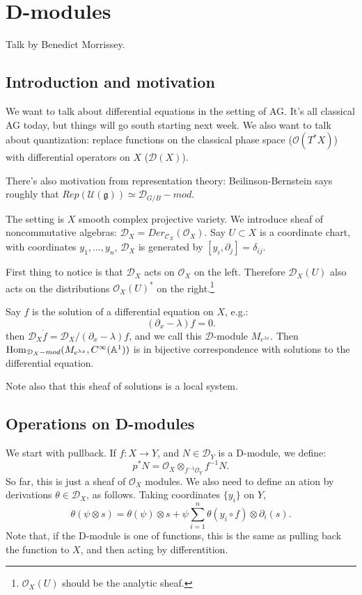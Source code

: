 \chapter{D-modules}
Talk by Benedict Morrissey.

\section{Introduction and motivation}

We want to talk about differential equations in the setting of AG. It's all classical AG today, but things will go south starting
next week. We also want to talk about quantization: replace functions on the classical phase space ($\mathcal{O}(T^*X)$) with
differential operators on $X$ ($\mathcal{D}(X)$).

There's also motivation from representation theory: Beilinson-Bernstein says roughly that $Rep(\mathcal{U}(\mathfrak g))
\simeq \mathcal{D}_{G/B} - mod$.

The setting is $X$ smooth complex projective variety. We introduce sheaf of noncommutative algebras: $\mathcal{D}_X
 = Der_{\mathcal{C}_X}(\mathcal{O}_X)$. Say $U \subset X$ is a coordinate chart, with coordinates $y_1, \dots, y_n$,
$\mathcal{D}_X$ is generated by $[y_i, \partial_j] = \delta_{ij}$.

First thing to notice is that $\mathcal{D}_X$ acts on $\mathcal{O}_X$ on the left. Therefore $\mathcal{D}_X(U)$ also
acts on the distributions $\mathcal{O}_X(U)^*$ on the right.\footnote{$\mathcal{O}_X(U)$ should be the analytic sheaf.}

Say $f$ is the solution of a differential equation on $X$, e.g.:
\[	(\partial_x - \lambda) f = 0. 	\]
then $\mathcal{D}_X \dot f = \mathcal{D}_X / (\partial_x - \lambda) f$, and we call this $\mathcal{D}$-module
$M_{e^{\lambda x}}$. Then $\operatorname{Hom}_{\mathcal{D}_X -mod}(M_{e^{\lambda x}}, C^{\infty}(\mathbb A^1))$ is in bijective
correspondence with solutions to the differential equation.

Note also that this sheaf of solutions is a local system. 


\section{Operations on D-modules}
\begin{eg}
We start with pullback. If $f:X \to Y$, and $N \in \mathcal{D}_Y$ is a D-module, we define:
\[	p^*N = \mathcal{O}_X \otimes_{f^{-1} \mathcal{O}_Y} f^{-1} N.	\]
So far, this is just a sheaf of $\mathcal{O}_X$ modules. We also need to define an ation by derivations $\theta \in \mathcal{D}_X$,
as follows.  Taking coordinates $\{y_i\}$ on $Y$,
\[	\theta(\psi \otimes s) = \theta(\psi) \otimes s + \psi \sum_{i=1}^n \theta(y_i \circ f) \otimes \partial_i(s).	\]
Note that, if the D-module is one of functions, this is the same as pulling back the function to $X$, and then acting by differentition.
\end{eg}

